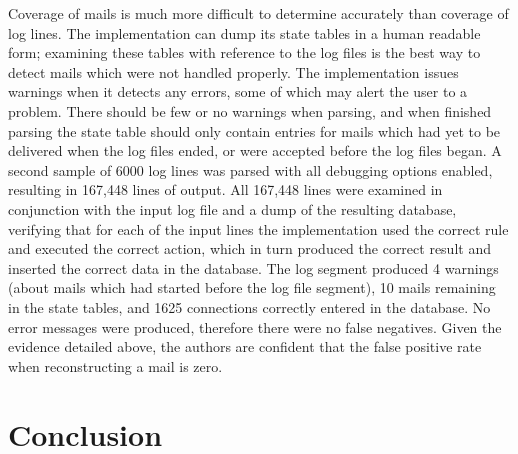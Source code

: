 \documentclass[draft]{svmult}
\begin{document}
Coverage of mails is much more difficult to determine accurately than
coverage of log lines.  The implementation can dump its state tables in a
human readable form; examining these tables with reference to the log files
is the best way to detect mails which were not handled properly.  The
implementation issues warnings when it detects any errors, some of which
may alert the user to a problem.  There should be few or no warnings when
parsing, and when finished parsing the state table should only contain
entries for mails which had yet to be delivered when the log files ended,
or were accepted before the log files began.  A second sample of 6000 log
lines was parsed with all debugging options enabled, resulting in 167,448
lines of output.  All 167,448 lines were examined in conjunction with the
input log file and a dump of the resulting database, verifying that for
each of the input lines the implementation used the correct rule and
executed the correct action, which in turn produced the correct result and
inserted the correct data in the database.  The log segment produced 4
warnings (about mails which had started before the log file segment), 10
mails remaining in the state tables, and 1625 connections correctly entered
in the database.  No error messages were produced, therefore there were no
false negatives.  Given the evidence detailed above, the authors are
confident that the false positive rate when reconstructing a mail is zero.


\section{Conclusion}
\end{document}
